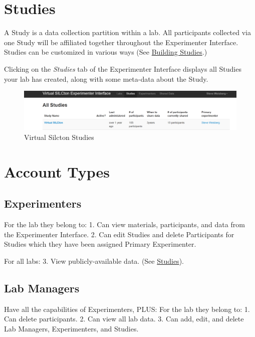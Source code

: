 \documentclass[
  12pt,
]{book}
\begin{document}
\hypertarget{studies}{%
\section{Studies}\label{studies}}

A Study is a data collection partition within a lab. All participants collected via one Study will be affiliated together throughout the Experimenter Interface. Studies can be customized in various ways (See \protect\hyperlink{building-studies}{Building Studies}.)

Clicking on the \emph{Studies} tab of the Experimenter Interface displays all Studies your lab has created, along with some meta-data about the Study.

\begin{figure}
\centering
\includegraphics{./figs/exp_interface_2.png}
\caption{Virtual Silcton Studies}
\end{figure}

\hypertarget{account-types}{%
\section{Account Types}\label{account-types}}

\hypertarget{experimenters}{%
\subsection{Experimenters}\label{experimenters}}

For the lab they belong to:
1. Can view materials, participants, and data from the Experimenter Interface.
2. Can edit Studies and delete Participants for Studies which they have been assigned Primary Experimenter.

For all labs:
3. View publicly-available data. (See \protect\hyperlink{building-studies}{Studies}).

\hypertarget{lab-managers}{%
\subsection{Lab Managers}\label{lab-managers}}

Have all the capabilities of Experimenters, PLUS:
For the lab they belong to:
1. Can delete participants.
2. Can view all lab data.
3. Can add, edit, and delete Lab Managers, Experimenters, and Studies.
\end{document}
